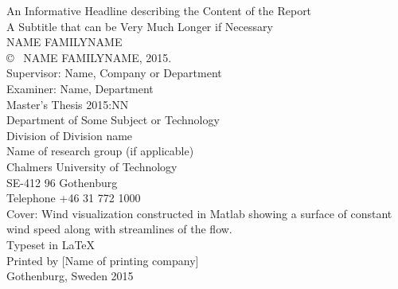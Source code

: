 \newpage
\thispagestyle{plain}
\vspace*{4.5cm}
An Informative Headline describing the Content of the Report\\
A Subtitle that can be Very Much Longer if Necessary\\
NAME FAMILYNAME\\[0.5cm]

\copyright ~ NAME FAMILYNAME, 2015.\\[0.5cm]

Supervisor: Name, Company or Department\\
Examiner: Name, Department\\[0.5cm]

Master's Thesis 2015:NN\\
Department of Some Subject or Technology\\
Division of Division name\\
Name of research group (if applicable)\\
Chalmers University of Technology\\
SE-412 96 Gothenburg\\
Telephone +46 31 772 1000\\

\vfill
Cover: Wind visualization constructed in Matlab showing a surface of constant wind speed along with streamlines of the flow. \\

Typeset in \LaTeX \\
Printed by [Name of printing company]\\
Gothenburg, Sweden 2015
